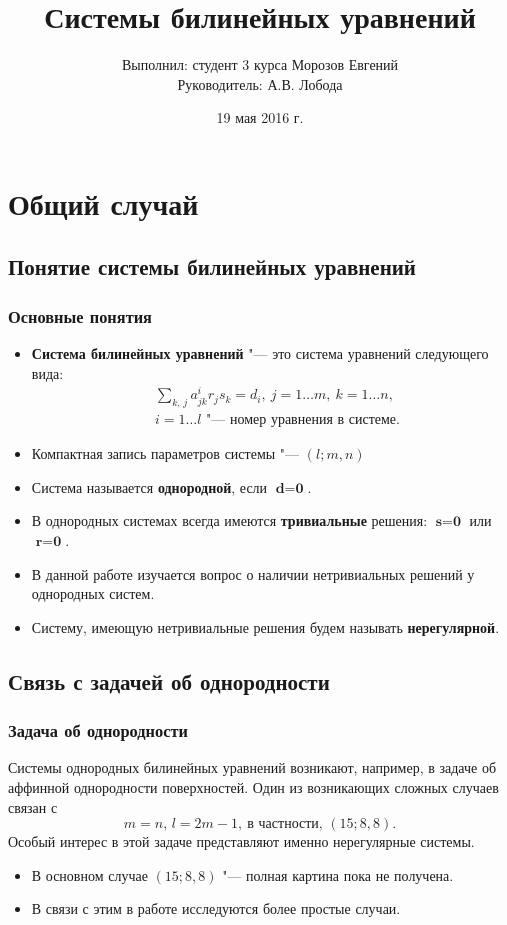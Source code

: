 \documentclass[russian,hyperref={unicode}]{beamer}
\title{Системы билинейных уравнений}
\institute
{
	Воронежский Государственный Университет \\
	Факультет Компьютерных Наук \\
	Кафедра Цифровых Технологий
}
\author
{
	Выполнил: студент 3 курса Морозов Евгений \\
	Руководитель: А.В. Лобода
}
\date{19 мая 2016 г.}
\begin{document}
\frame{\titlepage}


\section{Общий случай}
\subsection{Понятие системы билинейных уравнений}
\frame
{
  \frametitle{Основные понятия}
  
	\begin{itemize}
		\item \textbf{Система билинейных уравнений} "--- это система уравнений следующего 
			вида:
			\begin{align*}
				&\sum_{k,\,j}a^{i}_{jk} r_j s_k = d_i,~j=1 \dots m,~k=1 \dots n, \\
				& i = 1 \dots l \text{ "--- номер уравнения в системе.}
			\end{align*}
		\item Компактная запись параметров системы "--- $(l; m, n)$
		\item Система называется \textbf{однородной}, если $\textbf{d} = \textbf{0}$. 
	 	\item В однородных 	системах всегда имеются \textbf{тривиальные} решения: 
			$ \textbf{s} = \textbf{0}$ или $\textbf{r} = \textbf{0} $.
		\item В данной работе изучается вопрос о наличии нетривиальных решений у 
		однородных систем.
		\item Систему, имеющую нетривиальные решения будем называть 
		\textbf{нерегулярной}.
	\end{itemize}
}
\subsection{Связь с задачей об однородности}
\frame
{
	\frametitle{Задача об однородности}
	
	Системы однородных билинейных уравнений  возникают, например,
	в задаче об аффинной однородности поверхностей. Один из возникающих сложных случаев 
	связан с 
	$$m = n,\,l = 2m - 1,~\text{в частности, } (15; 8, 8).$$ 
	Особый интерес в этой задаче представляют именно нерегулярные системы.
	\begin{itemize}
		\item В основном случае $(15; 8, 8)$ "--- полная картина пока не получена.
		\item В связи с этим в работе исследуются более простые случаи.
	\end{itemize}
}
\end{document}
